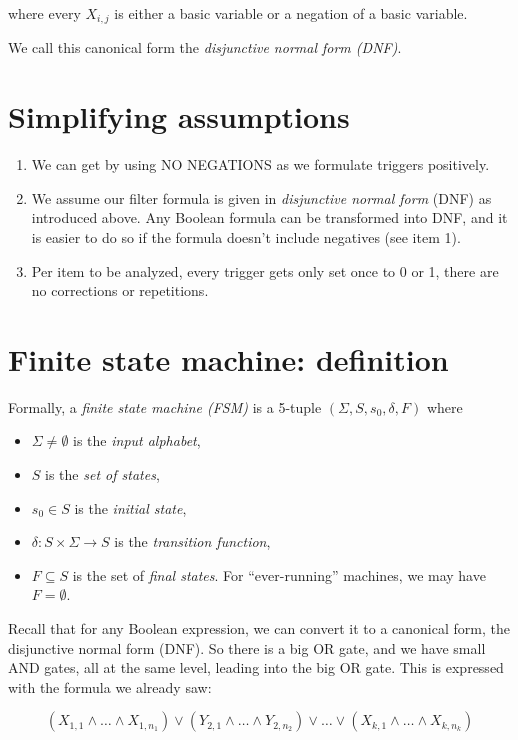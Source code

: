 \documentclass[12pt]{amsart}
\begin{document}
where every $X_{i,j}$ is either a basic variable or a
negation of a basic variable.

We call this canonical form the {\em disjunctive normal form (DNF)}.

\section{Simplifying assumptions}
\begin{enumerate}
    \item We can get by using NO NEGATIONS as we formulate triggers 
        positively.
    \item We assume our filter formula is given in {\em disjunctive normal
        form} (DNF) as introduced above. Any Boolean formula can be 
        transformed
        into DNF, and it is easier to do so if the formula doesn't include
        negatives (see item 1). 
    \item Per item to be analyzed, every trigger gets only set
        once to 0 or 1, there are no corrections or repetitions.
\end{enumerate}

\section{Finite state machine: definition}
Formally, a {\em finite state machine (FSM)} is a 5-tuple $(\Sigma, S, s_0,
\delta, F)$ where
\begin{itemize}
        \item $\Sigma\neq \emptyset$ is the {\em input alphabet},
        \item $S$ is the {\em set of states},
        \item $s_0\in S$ is the {\em initial state},
        \item $\delta:S\times \Sigma \to S$ is the {\em transition 
            function},
        \item $F\subseteq S$ is the set of {\em final states}. 
            For ``ever-running'' machines, we may have $F=\emptyset$. 
\end{itemize}
Recall that for any Boolean expression, we can convert it to a canonical
form, the disjunctive normal form (DNF).  So there is a big 
OR gate, and we have 
small AND gates, all at the same level, leading into the big
OR gate. This is expressed with the formula we already saw:

$$(X_{1,1}\land\ldots\land X_{1,n_1}) \lor (Y_{2,1}\land\ldots\land Y_{2,n_2})\lor \ldots
\lor (X_{k,1}\land\ldots\land X_{k,n_k})$$
\end{document}
